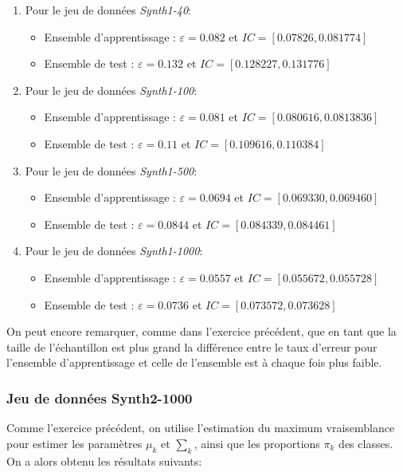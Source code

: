 \documentclass[a4paper,11pt]{article}
\begin{document}
\begin{enumerate}
  \item Pour le jeu de données \textit{Synth1-40}:
  \begin{itemize}
    \item Ensemble d’apprentissage :  $\varepsilon = 0.082$ et $IC = [0.07826,0.081774]$
    \item Ensemble de test :  $\varepsilon = 0.132$ et $IC = [0.128227,0.131776]$
  \end{itemize}
  \item Pour le jeu de données \textit{Synth1-100}:
  \begin{itemize}
    \item Ensemble d’apprentissage :  $\varepsilon = 0.081$ et $IC = [0.080616,0.0813836]$
    \item Ensemble de test :  $\varepsilon = 0.11$ et $IC = [0.109616,0.110384]$
  \end{itemize}
  \item Pour le jeu de données \textit{Synth1-500}:
  \begin{itemize}
    \item Ensemble d’apprentissage :  $\varepsilon = 0.0694$ et $IC = [0.069330,0.069460]$
    \item Ensemble de test :  $\varepsilon = 0.0844$ et $IC = [0.084339,0.084461]$
  \end{itemize}
  \item Pour le jeu de données \textit{Synth1-1000}:
  \begin{itemize}
    \item Ensemble d’apprentissage :  $\varepsilon = 0.0557$ et $IC = [0.055672,0.055728]$
    \item Ensemble de test :  $\varepsilon = 0.0736$ et $IC = [0.073572,0.073628]$
  \end{itemize}
\end{enumerate}

On peut encore remarquer, comme dans l’exercice précédent, que en tant que la taille de l'échantillon est plus grand la différence entre le taux d'erreur pour l'ensemble d'apprentissage et celle de l'ensemble est à chaque fois plus faible.

\subsubsection*{Jeu de données Synth2-1000}

Comme l’exercice précédent, on utilise l’estimation du maximum vraisemblance pour estimer les paramètres $ \mu_k $ et $ \sum_k $,
ainsi que les proportions $\pi_k$ des classes. On a alors obtenu les résultats suivants:
\end{document}
